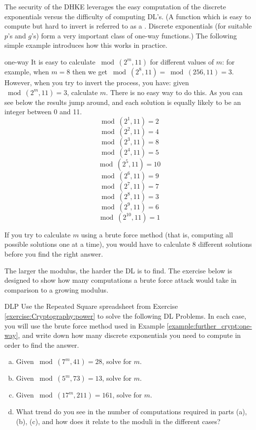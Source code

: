 The security of the DHKE leverages the easy computation of the discrete exponentials versus the difficulty of computing DL's. (A function which is easy to compute but hard to invert is referred to as a . Discrete exponentials (for suitable $p$'s and $g$'s) form a very important class of one-way functions.)
The following simple example introduces how this works in practice. 

\begin{example}{one-way}
It is easy to calculate $\bmod(2^{m},  11)$ for different values of $m$: for example, when $m =8$ then we get $\bmod(2^{8},  11) =\bmod(256,  11)  = 3$.  However, when you try to invert the process, you have: given $\bmod(2^{m},  11) = 3$, calculate $m$. There is no easy way to do this. As you can see below the results jump around, and each solution is equally likely to be an integer between 0 and 11. 
$$ \bmod(2^{1}, 11)=2$$
$$ \bmod(2^{2}, 11)=4$$
$$ \bmod(2^{3}, 11)=8$$
$$ \bmod(2^{4}, 11)=5$$
$$ \bmod(2^{5}, 11)=10$$
$$ \bmod(2^{6}, 11)=9$$
$$ \bmod(2^{7}, 11)=7$$
$$ \bmod(2^{8}, 11)=3$$
$$ \bmod(2^{9}, 11)=6$$
$$ \bmod(2^{10}, 11)=1$$
\end{example}
If you try to calculate $m$ using a brute force method (that is, computing all possible solutions one at a time), you would have to calculate 8 different solutions before you find the right answer. 

The larger the modulus, the harder the DL is to find. The exercise below is designed to show how many computations a brute force attack would take in comparison to a growing modulus.

\begin{exercise}{DLP}
Use the Repeated Square spreadsheet from Exercise \ref{exercise:Cryptography:power} to solve the following DL Problems. In each case, you will use the brute force method used in Example \ref{example:further_crypt:one-way}, and write down how many discrete exponentials you need to compute in order to find the answer.  
\begin{enumerate}[(a)]
\item Given $ \bmod(7^{m}, 41)=28$, solve for $m$.

\item Given $ \bmod(5^{m}, 73)=13$, solve for $m$.

\item Given $ \bmod(17^{m}, 211)=161$, solve for $m$.

\item
What trend do you see in the number of computations required in parts (a), (b), (c), and how does it relate to the moduli in the different cases?
\end{enumerate}
\end{exercise}

